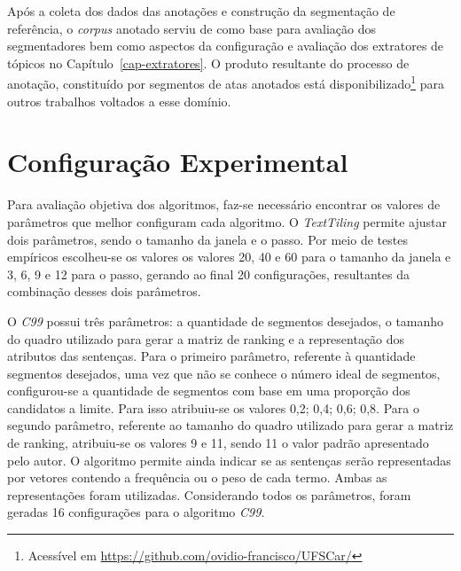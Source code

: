 Após a coleta dos dados das anotações e construção da segmentação de referência, o \textit{corpus} anotado serviu de como base para avaliação dos segmentadores bem como aspectos da configuração e avaliação dos extratores de tópicos no Capítulo~\ref{cap-extratores}. O produto resultante do processo de anotação, constituído por segmentos de atas anotados está disponibilizado\footnote{Acessível em  \url{https://github.com/ovidio-francisco/UFSCar/}} para outros trabalhos voltados a esse domínio. 








\section{Configuração Experimental}
\label{subsec:configuracaoexperimental}

  
Para avaliação objetiva dos algoritmos, faz-se necessário encontrar os valores de parâmetros que melhor configuram cada algoritmo.
O \textit{TextTiling} permite ajustar dois parâmetros, sendo o tamanho da janela e o passo. Por meio de testes empíricos escolheu-se os valores os valores 20, 40 e 60 para o tamanho da janela e 3, 6, 9 e 12 para o passo, gerando ao final 20 configurações, resultantes da combinação desses dois parâmetros.
%

O \textit{C99} possui três parâmetros: 
a quantidade de segmentos desejados, 
o tamanho do quadro utilizado para gerar a matriz de ranking e
a representação dos atributos das sentenças.
Para o primeiro parâmetro, referente à quantidade segmentos desejados, uma vez que não se conhece o número ideal de segmentos, configurou-se a quantidade de segmentos com base em uma proporção dos candidatos a limite. Para isso atribuiu-se os valores {0,2; 0,4; 0,6; 0,8}. 
Para o segundo parâmetro, referente ao tamanho do quadro utilizado para gerar a matriz de ranking, atribuiu-se os valores 9 e 11, sendo 11 o valor padrão apresentado pelo autor. 
O algoritmo permite ainda indicar se as sentenças serão representadas por vetores contendo a frequência ou o peso de cada termo. Ambas as representações foram utilizadas. Considerando todos os parâmetros, foram geradas 16 configurações para o algoritmo \textit{C99}.

